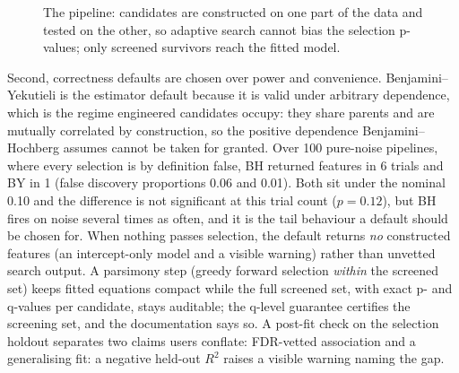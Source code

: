 \documentclass[
]{article}
\begin{document}
\begin{figure}[tbp]
\centering
{}
\caption{The pipeline: candidates are constructed on one part of the data
and tested on the other, so adaptive search cannot bias the selection
p-values; only screened survivors reach the fitted model.}
\end{figure}

Second, correctness defaults are chosen over power and convenience.
Benjamini--Yekutieli is the estimator default because it is valid under
arbitrary dependence, which is the regime engineered candidates occupy:
they share parents and are mutually correlated by construction, so the
positive dependence Benjamini--Hochberg assumes cannot be taken for
granted. Over 100 pure-noise pipelines, where every selection is by
definition false, BH returned features in 6 trials and BY in 1 (false
discovery proportions 0.06 and 0.01). Both sit under the nominal 0.10
and the difference is not significant at this trial count
(\(p = 0.12\)), but BH fires on noise several times as often, and it is
the tail behaviour a default should be chosen for. When nothing passes
selection, the default returns \emph{no} constructed features (an
intercept-only model and a visible warning) rather than unvetted search
output. A parsimony step (greedy forward selection \emph{within} the
screened set) keeps fitted equations compact while the full screened
set, with exact p- and q-values \citep{storey2002} per candidate, stays
auditable; the q-level guarantee certifies the screening set, and the
documentation says so. A post-fit check on the selection holdout
separates two claims users conflate: FDR-vetted association and a
generalising fit: a negative held-out \(R^2\) raises a visible warning
naming the gap.
\end{document}
